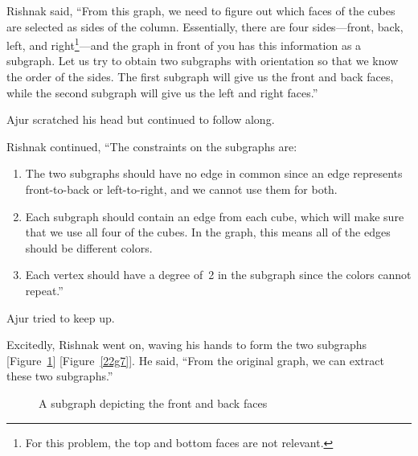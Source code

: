 Rishnak said, ``From this graph, we need to figure out which faces of the cubes are selected as sides of the column. Essentially, there are four sides---front, back, left, and right\footnote{For this problem, the top and bottom faces are not relevant.}---and the graph in front of you has this information as a subgraph. Let us try to obtain two subgraphs with orientation so that we know the order of the sides. The first subgraph will give us the front and back faces, while the second subgraph will give us the left and right faces.''

Ajur scratched his head but continued to follow along.

Rishnak continued, ``The constraints on the subgraphs are:
\begin{enumerate}
    \item The two subgraphs should have no edge in common since an edge represents front-to-back or left-to-right, and we cannot use them for both.
    \item Each subgraph should contain an edge from each cube, which will make sure that we use all four of the cubes. In the graph, this means all of the edges should be different colors.
    \item Each vertex should have a degree of~2 in the subgraph since the colors cannot repeat.''
\end{enumerate}

Ajur tried to keep up.

Excitedly, Rishnak went on, waving his hands to form the two subgraphs [Figure~\ref{22g6}] [Figure~\ref{22g7}]. He said, ``From the original graph, we can extract these two subgraphs.''

\begin{figure}[h]
\begin{center}
\caption{A subgraph depicting the front and back faces}\label{22g6}
\end{center}
\end{figure}

